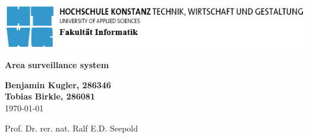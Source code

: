 \begin{titlepage}

	\includegraphics[width=1.00\textwidth]{images/HTWG_logo.PNG}

	\vspace*{1cm}
	\begin{center}
		\Huge
		\vspace{2cm}
		\textbf{Area surveillance system} \\
		\vspace{1cm}
		\large
		
		\vspace{1cm}
		\textbf{Benjamin Kugler, 286346} \\
		\textbf{Tobias Birkle, 286081} \\
		\today\\
		\vspace{2cm}
		
		
		Prof. Dr. rer. nat. Ralf E.D. Seepold\\
		

		
	\end{center}
	\normalsize
	\vfill
\end{titlepage}

